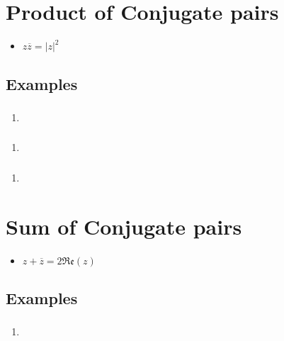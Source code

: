 \documentclass{report}
\newcommand{\re}[1]{\mathfrak{Re}(#1)}
\newcommand{\conjugate}[1]{\overline{#1}}
\newcommand{\abs}[1]{\mathopen|#1\mathclose|}
\begin{document}
        \section{Product of Conjugate pairs}
            \begin{itemize}
                \item $z\conjugate{z}=\abs{z}^{2}$
            \end{itemize}
            \subsection{Examples}
                \subsubsection{}
                    \begin{enumerate}
                        \item 
                    \end{enumerate}
                \subsubsection{}
                    \begin{enumerate}
                        \item 
                    \end{enumerate}
                \subsubsection{}
                    \begin{enumerate}
                        \item 
                    \end{enumerate}
        \section{Sum of Conjugate pairs}
            \begin{itemize}
                \item $z+\conjugate{z}=2\re{z}$
            \end{itemize}
            \subsection{Examples}
                \subsubsection{}
                    \begin{enumerate}
                        \item 
                    \end{enumerate}
\end{document}
